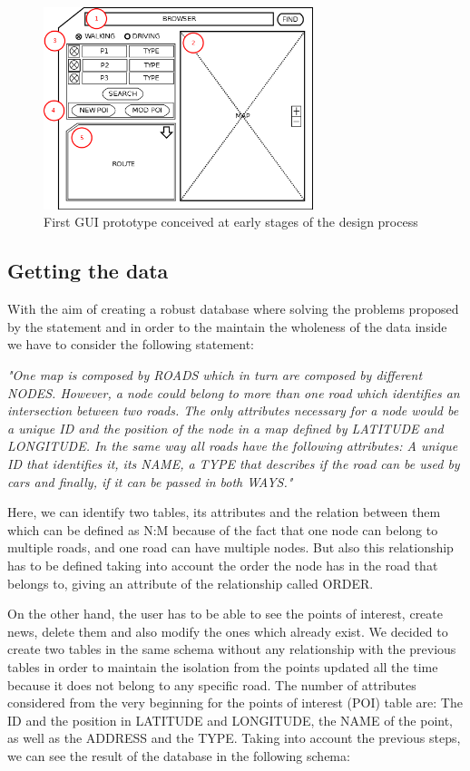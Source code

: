 \documentclass{article}
\begin{document}
\begin{figure}[h]
\centering
\includegraphics[width=0.7\textwidth]{Prototype.png}
\caption{First GUI prototype conceived at early stages of the design process}
\label{fig:GUIprototype}
\end{figure}

\subsection{Getting the data}
With the aim of creating a robust database where solving the problems proposed by the statement and in order to the maintain the wholeness of the data inside we have to consider the following statement:

\textit{"One map is composed by ROADS which in turn are composed by different NODES. However, a node could belong to more than one road which identifies an intersection between two roads. The only attributes necessary for a node would be a unique ID and the position of the node in a map defined by LATITUDE and LONGITUDE. In the same way all roads have the following attributes: A unique ID that identifies it, its NAME, a TYPE that describes if the road can be used by cars and finally, if it can be passed in both WAYS."}

Here, we can identify two tables, its attributes and the relation between them which can be defined as N:M because of the fact that one node can belong to multiple roads, and one road can have multiple nodes. But also this relationship has to be defined taking into account the order the node has in the road that belongs to, giving an attribute of the relationship called ORDER.

On the other hand, the user has to be able to see the points of interest, create news, delete them and also modify the ones which already exist. We decided to create two tables in the same schema without any relationship with the previous tables in order to maintain the isolation from the points updated all the time because it does not belong to any specific road.
The number of attributes considered from the very beginning for the points of interest (POI) table are: The ID and the position in LATITUDE and LONGITUDE, the NAME of the point, as well as the ADDRESS and the TYPE. Taking into account the previous steps, we can see the result of the database in the following schema:
\end{document}
